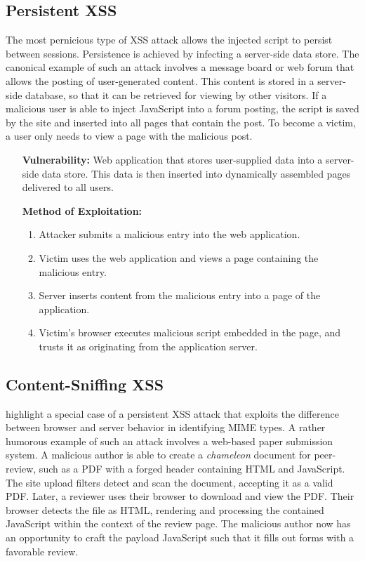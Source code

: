 \documentclass{acmtrans2m}
\begin{document}
\subsection{Persistent XSS}\label{sec:xss-types-persistent}
The most pernicious type of XSS attack allows the injected script to persist between sessions.
Persistence is achieved by infecting a server-side data store.
The canonical example of such an attack involves a message board or web forum that allows the posting of user-generated content.
This content is stored in a server-side database, so that it can be retrieved for viewing by other visitors.
If a malicious user is able to inject JavaScript into a forum posting, the script is saved by the site and inserted into all pages that contain the post.
To become a victim, a user only needs to view a page with the malicious post.

\begin{itemize}
 \item[\textbf{Vulnerability:}] Web application that stores user-supplied data into a server-side data store.
This data is then inserted into dynamically assembled pages delivered to all users.
 \item[\textbf{Method of Exploitation:}]~
  \begin{enumerate}
   \item Attacker submits a malicious entry into the web application.
   \item Victim uses the web application and views a page containing the malicious entry.
   \item Server inserts content from the malicious entry into a page of the application.
   \item Victim's browser executes malicious script embedded in the page, and trusts it as originating from the application server.
  \end{enumerate}
\end{itemize}

\subsection{Content-Sniffing XSS}\label{sec:xss-types-content}
 highlight a special case of a persistent XSS attack that exploits the difference between browser and server behavior in identifying MIME types.
A rather humorous example of such an attack involves a web-based paper submission system.
A malicious author is able to create a \emph{chameleon} document for peer-review, such as a PDF with a forged header containing HTML and JavaScript.
The site upload filters detect and scan the document, accepting it as a valid PDF.
Later, a reviewer uses their browser to download and view the PDF.
Their browser detects the file as HTML, rendering and processing the contained JavaScript within the context of the review page.
The malicious author now has an opportunity to craft the payload JavaScript such that it fills out forms with a favorable review.
\end{document}
